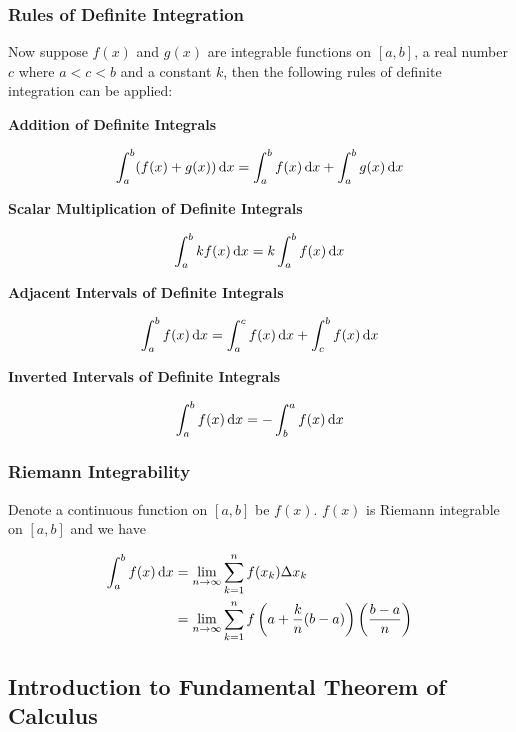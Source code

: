 \documentclass[a4paper,12pt]{article}
\begin{document}
\subsubsection{Rules of Definite Integration}
\begin{pst}
  Now suppose $f(x)$ and $g(x)$ are integrable functions on $[a,b]$, a real number $c$ where $a<c<b$ and a constant $k$, then the following rules of definite integration can be applied:

  \begin{alist}
    \item \textbf{Addition of Definite Integrals}

    $$\int_{a}^{b}(f(x)+g(x))\,\mathrm{d} x=\int_{a}^{b}f(x)\,\mathrm{d} x+\int_{a}^{b}g(x)\,\mathrm{d} x$$

    \item \textbf{Scalar Multiplication of Definite Integrals}

    $$\int_{a}^{b}kf(x)\,\mathrm{d} x=k\int_{a}^{b}f(x)\,\mathrm{d} x$$

    \item \textbf{Adjacent Intervals of Definite Integrals}

    $$\int_{a}^{b}f(x)\,\mathrm{d} x=\int_{a}^{c}f(x)\,\mathrm{d} x+\int_{c}^{b}f(x)\,\mathrm{d} x$$

    \item \textbf{Inverted Intervals of Definite Integrals}

    $$\int_{a}^{b}f(x)\,\mathrm{d} x=-\int_{b}^{a}f(x)\,\mathrm{d} x$$
  \end{alist}
\end{pst}

\subsubsection{Riemann Integrability}
\begin{thm}
  Denote a continuous function on $[a,b]$ be $f(x)$. $f(x)$ is Riemann integrable on $[a,b]$ and we have

  $$\begin{aligned}[t]
    \int_{a}^{b}f(x)\,\mathrm{d} x&=\lim_{n\to\infty}\sum_{k=1}^{n}f(x_{k})\Delta x_{k}\\
    &=\lim_{n\to\infty}\sum_{k=1}^{n}f\left( a+\frac{k}{n}(b-a)\right)\left( \frac{b-a}{n}\right)
  \end{aligned}$$
\end{thm}

\propdisp

\subsection{Introduction to Fundamental Theorem of Calculus}
\end{document}
